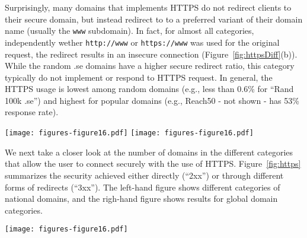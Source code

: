 \documentclass{sig-alternate-10pt}
\begin{document}
Surprisingly, many domains that implements HTTPS do not redirect clients to their secure domain,
but instead redirect to to a preferred variant of their domain name (usually the \texttt{www} subdomain).
In fact, for almost all categories, 
independently wether \texttt{http://www} or \texttt{https://www} was used for the original request,
the redirect results in an insecure connection (Figure~\ref{fig:httpsDiff}(b)).
While the random .se domains have a higher secure redirect ratio,
this category typically do not implement or respond to HTTPS request. 
In general,
the HTTPS usage is lowest among random domains (e.g., less than 0.6\% for ``Rand 100k .se'')
and highest for popular domains (e.g., Reach50 - not shown - has 53\% response rate).



\begin{figure*}[t]
\texttt{[image: figures-figure16.pdf]}
\texttt{[image: figures-figure16.pdf]}
\caption{Secure connections for succesful connections when trying to use HTTPS.
(Note that the majority of websites (as per Figure~\ref{fig:httpsDiff}) do not respond.)}
\label{fig:https}
\vspace{-0pt}
\end{figure*}

We next take a closer look at the number of domains in the different categories 
that allow the user to connect securely with the use of HTTPS.  Figure~\ref{fig:https} 
summarizes the security achieved either directly (``2xx'')
or through different forms of redirects (``3xx'').  The left-hand figure
shows different categories of national domains, and the righ-hand figure
shows results for global domain categories.

\begin{figure*}[t]
\texttt{[image: figures-figure16.pdf]}
\caption{Secure connections for succesful HTTPS attempts (top row)
and HTTP attempts (bottom row).
(Note that the majority of websites does not respnd to HTTPS (as per Figure~\ref{fig:httpsDiff}).)}
\label{fig:https2}
\vspace{-0pt}
\end{figure*}
\end{document}
